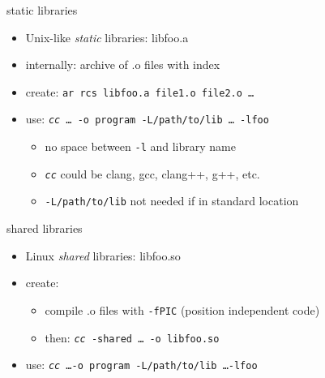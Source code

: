 \begin{frame}{static libraries}
    \begin{itemize}
    \item Unix-like \textit{static} libraries: libfoo.a
    \item internally: archive of .o files with index
    \item create: \texttt{ar rcs libfoo.a file1.o file2.o \ldots}
    \item use: \texttt{\textit{cc} \ldots~-o program -L/path/to/lib \ldots~-lfoo}
        \begin{itemize}
        \item no space between \texttt{-l} and library name
        \item \texttt{\textit{cc}} could be clang, gcc, clang++, g++, etc.
        \item \texttt{-L/path/to/lib} not needed if in standard location
        \end{itemize}
    \end{itemize}
\end{frame}

\begin{frame}{shared libraries}
    \begin{itemize}
    \item Linux \textit{shared} libraries: libfoo.so
    \item create:
        \begin{itemize}
        \item compile .o files with \texttt{-fPIC} (position independent code)
        \item then: \texttt{\textit{cc} -shared \ldots~-o libfoo.so}
        \end{itemize}
    \item use: \texttt{\textit{cc} \ldots -o program -L/path/to/lib \ldots -lfoo}
    \end{itemize}
\end{frame}

